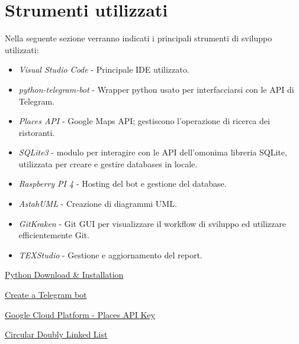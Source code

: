 \documentclass[a4paper, 12pt]{article}
\begin{document}
	\newpage
	\section{Strumenti utilizzati}
	Nella seguente sezione verranno indicati i principali strumenti di sviluppo utilizzati:\\
	\begin{itemize}
		\setlength{\parskip}{0pt}
		\setlength{\parsep}{0pt}
		
		\item \emph{Visual Studio Code} - Principale IDE utilizzato.
		\item \emph{python-telegram-bot} - Wrapper python usato per interfacciarsi con le API di Telegram.
		\item \emph{Places API} - Google Maps API; gestiscono l'operazione di ricerca dei ristoranti.
		\item \emph{SQLite3} - modulo per interagire con le API dell'omonima libreria SQLite, utilizzata per creare e gestire databases in locale.
		\item \emph{Raspberry PI 4} - Hosting del bot e gestione del database.
		\item \emph{AstahUML} - Creazione di diagrammi UML.
		\item \emph{GitKraken} - Git GUI per visualizzare il workflow di sviluppo ed utilizzare efficientemente Git.
		\item \emph{TEXStudio} - Gestione e aggiornamento del report.
	\end{itemize}
	\newpage
	\begin{thebibliography}{99}
		\href{https://www.python.org/downloads/}{Python Download \& Installation}
		
		\href{https://sendpulse.com/knowledge-base/chatbot/create-telegram-chatbot}{Create a Telegram bot}
		
		\href{https://developers.google.com/maps/documentation/places/web-service/get-api-key}{Google Cloud Platform - Places API Key}
		
		\href{https://pythonwife.com/circular-doubly-linked-list-in-python/#:~:text=A%20circular%20doubly%20linked%20list,tail%20node%20and%20vice%20versa.}{Circular Doubly Linked List}
		
	\end{thebibliography} 
\end{document}

